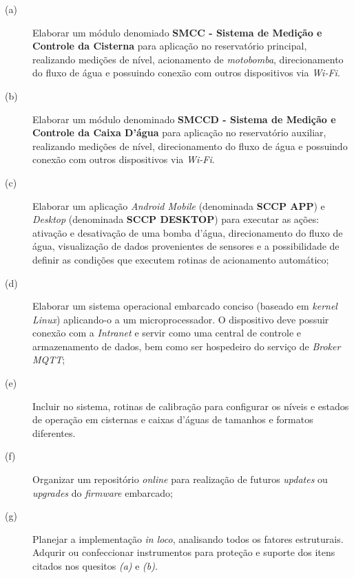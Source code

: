 \begin{description}
	\item [(a)] Elaborar um módulo denomiado \textbf{SMCC - Sistema de Medição e Controle da Cisterna} para aplicação no reservatório principal, realizando medições de nível, acionamento de \textit{motobomba}, direcionamento do fluxo de água e possuindo conexão com outros dispositivos via \textit{ Wi-Fi}.
	\item [(b)] Elaborar um módulo denominado \textbf{SMCCD - Sistema de Medição e Controle da Caixa D'água} para aplicação no reservatório auxiliar, realizando medições de nível, direcionamento do fluxo de água e possuindo conexão com outros dispositivos via \textit{Wi-Fi}.
	\item [(c)] Elaborar um aplicação \textit{Android Mobile} (denominada \textbf{SCCP APP}) e \textit{Desktop} (denominada \textbf{SCCP DESKTOP}) para executar as ações: ativação e desativação de uma bomba d'água, direcionamento do fluxo de água, visualização de dados provenientes de sensores e a possibilidade de definir as condições que executem rotinas de acionamento automático;
	\item [(d)] Elaborar um sistema operacional embarcado conciso (baseado em \textit{kernel Linux}) aplicando-o a um microprocessador. O dispositivo deve possuir conexão com a \textit{Intranet} e servir como uma central de controle e armazenamento de dados, bem como ser hospedeiro do serviço de \textit{Broker MQTT};
	\item [(e)] Incluir no sistema, rotinas de calibração para configurar os níveis e estados de operação em cisternas e caixas d'águas de tamanhos e formatos diferentes.
	\item [(f)] Organizar um repositório \textit{online} para realização de futuros \textit{updates} ou \textit{upgrades} do \textit{firmware} embarcado;
	\item [(g)] Planejar a implementação \textit{in loco},  analisando todos os fatores estruturais. Adqurir ou confeccionar instrumentos para proteção e suporte dos itens citados nos quesitos \textit{(a)} e \textit{(b)}.
\end{description}

\label{sec:objetivosespecificos}